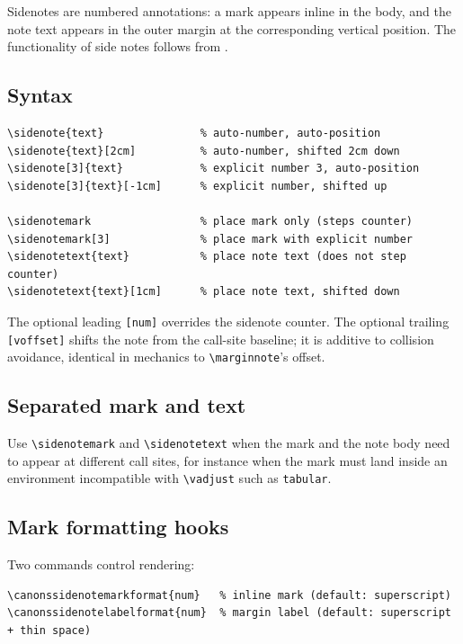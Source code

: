 \documentclass[11pt, twoside, openany]{book}
\newcommand{\cmd}[1]{\texttt{\textbackslash #1}}
\begin{document}
Sidenotes are numbered annotations: a mark appears inline in the body, and the note text appears in the outer margin at the corresponding vertical position. The functionality of side notes follows from \cite{sidenotes}.

\subsection{Syntax}\label{subsec:sidenotessyntax}

\begin{verbatim}
\sidenote{text}               % auto-number, auto-position
\sidenote{text}[2cm]          % auto-number, shifted 2cm down
\sidenote[3]{text}            % explicit number 3, auto-position
\sidenote[3]{text}[-1cm]      % explicit number, shifted up

\sidenotemark                 % place mark only (steps counter)
\sidenotemark[3]              % place mark with explicit number
\sidenotetext{text}           % place note text (does not step counter)
\sidenotetext{text}[1cm]      % place note text, shifted down
\end{verbatim}

The optional leading \texttt{[num]} overrides the sidenote counter. The optional trailing \texttt{[voffset]} shifts the note from the call-site baseline; it is additive to collision avoidance, identical in mechanics to \cmd{marginnote}'s offset.

\subsection{Separated mark and text}\label{subsec:sidenotesmark}

Use \cmd{sidenotemark} and \cmd{sidenotetext} when the mark and the note body need to appear at different call sites, for instance when the mark must land inside an environment incompatible with \cmd{vadjust} such as \texttt{tabular}.

\subsection{Mark formatting hooks}\label{subsec:sidenotesmarkhooks}

Two commands control rendering:
\begin{verbatim}
\canonssidenotemarkformat{num}   % inline mark (default: superscript)
\canonssidenotelabelformat{num}  % margin label (default: superscript + thin space)
\end{verbatim}
\end{document}
